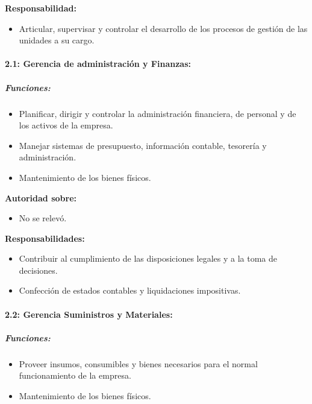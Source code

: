 \documentclass[a4paper,10pt]{article}
\begin{document}
		\textbf{Responsabilidad:}
		\begin{itemize}
		\item Articular, supervisar y controlar el desarrollo de los procesos de gestión de las unidades a su cargo.
		\end{itemize}

		\paragraph{2.1: Gerencia de administración y Finanzas:}
		
		\subparagraph{Funciones:}

		\begin{itemize}
			\item Planificar, dirigir y controlar la administración financiera, de personal y de los activos de la empresa.
 			\item Manejar sistemas de presupuesto, información contable, tesorería y administración.
 			\item Mantenimiento de los bienes físicos.

 		\end{itemize}
		
		\textbf{Autoridad sobre:} 
		\begin{itemize}
		\item No se relevó.
		\end{itemize}


		\textbf{Responsabilidades:}
		\begin{itemize}
			\item Contribuir al cumplimiento de las disposiciones legales y a la toma de decisiones.
			\item Confección de estados contables y liquidaciones impositivas.
		\end{itemize}	

			\paragraph{2.2: Gerencia Suministros y Materiales:}
		
		\subparagraph{Funciones:}
		\begin{itemize}
 			\item Proveer insumos, consumibles y bienes necesarios para el normal funcionamiento de la empresa.
 			\item Mantenimiento de los bienes físicos.

 		\end{itemize}
		
\end{document}
